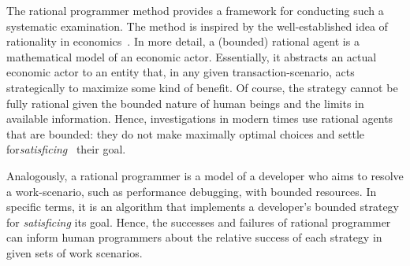 The rational programmer method provides a framework for conducting such a
systematic examination. The method is inspired by the well-established idea of
rationality in economics~\cite{mill1874essays, henrich2001search}.  In more
detail, a (bounded) rational agent is a mathematical model of an economic
actor. Essentially, it abstracts an actual economic actor to an entity that, in
any given transaction-scenario, acts strategically to maximize some kind of
benefit.  Of course, the strategy cannot be fully rational given the bounded
nature of human beings and the limits in available information. Hence,
investigations in modern times use rational agents that are bounded: they do not
make maximally optimal choices and settle
for\emph{satisficing}~\cite{hs:satisfice} their goal.

Analogously, a rational programmer is a model of a developer who aims to resolve
a work-scenario, such as performance debugging, with bounded resources. In
specific terms, it is an algorithm that implements a developer's bounded
strategy for \emph{satisficing} its goal.  Hence, the successes and failures of
rational programmer can inform human programmers about the relative success of
each strategy in given sets of work scenarios.




